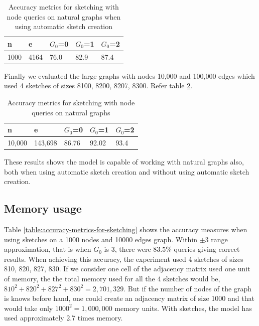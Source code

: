 \documentclass[conference]{IEEEtran}
\begin{document}
 
\begin{table}[!t]
\caption{Accuracy metrics for sketching with node queries on natural graphs when using automatic sketch creation}
\label{tabel:Accuracy metrics for sketching with node queries on natural graphs when using automatic sketch creation}
\centering
\begin{tabular}{|l|l|l|l|l|}
\hline
n    & e     & $G_0$=0 & $G_0$=1 & $G_0$=2 \\ \hline
1000 & 4164  & 76.0   & 82.9  & 87.4  \\ \hline
\end{tabular}
\end{table}

Finally we evaluated the large graphs with nodes 10,000 and 100,000 edges which used 4 sketches of sizes  8100, 8200, 8207, 8300. Refer table \ref{tabel:Accuracy metrics for sketching with node queries on natural graphs}.

\begin{table}[!t]
\caption{Accuracy metrics for sketching with node queries on natural graphs}
\label{tabel:Accuracy metrics for sketching with node queries on natural graphs}
\centering
\begin{tabular}{|l|l|l|l|l|}
\hline
n    & e     & $G_0$=0 & $G_0$=1 & $G_0$=2 \\ \hline
10,000 & 143,698  & 86.76   & 92.02  & 93.4  \\ \hline
\end{tabular}
\end{table}

These results shows the model is capable of working with natural graphs also, both when using automatic sketch creation and without using automatic sketch creation.

\subsection{Memory usage}
Table \ref{table:accuracy-metrics-for-sketching} shows the accuracy measures when using sketches on a 1000 nodes and 10000 edges graph. Within $\pm3$ range approximation, that is when $G_0$ is 3, there were $83.5\%$ queries giving correct results. When achieving this accuracy, the experiment used 4 sketches of sizes 810, 820, 827, 830. If we consider one cell of the adjacency matrix used one unit of memory, the the total memory used for all the 4 sketches would be, $810^2+820^2+827^2+830^2 = 2,701,329$. But if the number of nodes of the graph is knows before hand, one could create an adjacency matrix of size 1000 and that would take only $1000^2 = 1,000,000$ memory units. With sketches, the model has used approximately  2.7 times memory. 
\end{document}
